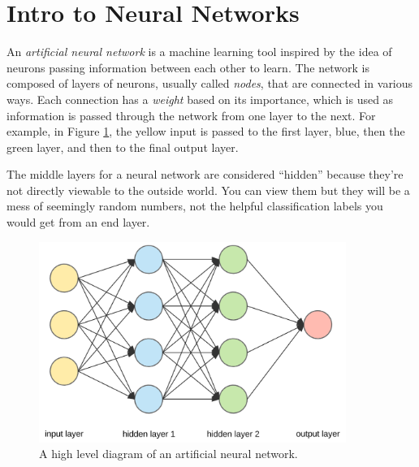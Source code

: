 \newcommand{\lieq}[1]{{\text{\li{#1}}}}

\labdependencies{}

\section*{Intro to Neural Networks}

An \emph{artificial neural network} is a machine learning tool inspired by the idea of neurons passing information between each other to learn.
The network is composed of layers of neurons, usually called \emph{nodes}, that are connected in various ways.
Each connection has a \emph{weight} based on its importance, which is used as information is passed through the network from one layer to the next.
For example, in Figure \ref{fig:neuralnet}, the yellow input is passed to the first layer, blue, then the green layer, and then to the final output layer.

The middle layers for a neural network are considered ``hidden'' because they're not directly viewable to the outside world.
You can view them but they will be a mess of seemingly random numbers, not the helpful classification labels you would get from an end layer.

\begin{figure}[h]
\includegraphics[width=10cm]{figures/neural_net.png}
\caption{A high level diagram of an artificial neural network.}
\label{fig:neuralnet}
\end{figure}

